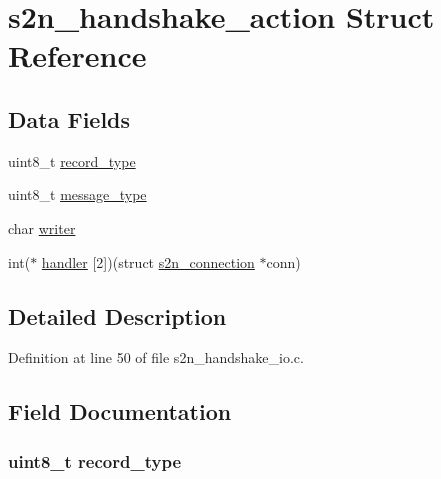 \hypertarget{structs2n__handshake__action}{}\section{s2n\+\_\+handshake\+\_\+action Struct Reference}
\label{structs2n__handshake__action}
\subsection*{Data Fields}
\begin{DoxyCompactItemize}
\item 
uint8\+\_\+t \hyperlink{structs2n__handshake__action_a7ba867b99c2b823386437aeef37f3390}{record\+\_\+type}
\item 
uint8\+\_\+t \hyperlink{structs2n__handshake__action_aeaaffeace8c23899e558022f62ce6de4}{message\+\_\+type}
\item 
char \hyperlink{structs2n__handshake__action_a2b7f5b7488391b0e62a33a69046f4ee5}{writer}
\item 
int($\ast$ \hyperlink{structs2n__handshake__action_a12cc0ccb2edb4b5554f5d618425e9e56}{handler} \mbox{[}2\mbox{]})(struct \hyperlink{structs2n__connection}{s2n\+\_\+connection} $\ast$conn)
\end{DoxyCompactItemize}


\subsection{Detailed Description}


Definition at line 50 of file s2n\+\_\+handshake\+\_\+io.\+c.



\subsection{Field Documentation}
\subsubsection[{\texorpdfstring{record\+\_\+type}{record_type}}]{\setlength{\rightskip}{0pt plus 5cm}uint8\+\_\+t record\+\_\+type}\hypertarget{structs2n__handshake__action_a7ba867b99c2b823386437aeef37f3390}{}\label{structs2n__handshake__action_a7ba867b99c2b823386437aeef37f3390}


